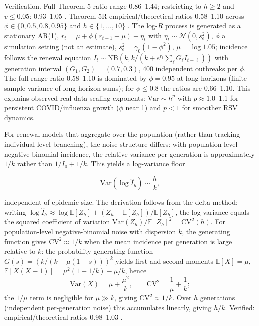 \documentclass[review]{elsarticle}
\theoremstyle{plain}
\theoremstyle{definition}
\begin{document}
Verification. Full Theorem 5 ratio range 0.86--1.44; restricting to $h \geq 2$ and $v \leq 0.05$: 0.93--1.05 . Theorem 5R empirical/theoretical ratios 0.58--1.10 across $\phi \in \{0, 0.5, 0.8, 0.95\}$ and $h \in \{1, \dots, 10\}$ . The log-$R$ process is generated as a stationary AR(1), $r_t = \mu + \phi(r_{t-1}-\mu) + \eta_t$ with $\eta_t \sim \mathcal{N}(0, s_e^2)$, $\phi$ a simulation setting (not an estimate), $s_e^2 = \gamma_0(1-\phi^2)$, $\mu = \log 1.05$; incidence follows the renewal equation $I_t \sim \text{NB}(k, k/(k + e^{r_t}\sum_\ell G_\ell I_{t-\ell}))$ with generation interval $(G_1, G_2) = (0.7, 0.3)$, 400 independent outbreaks per $\phi$. The full-range ratio 0.58--1.10 is dominated by $\phi = 0.95$ at long horizons (finite-sample variance of long-horizon sums); for $\phi \leq 0.8$ the ratios are 0.66--1.10. This explains observed real-data scaling exponents: $\text{Var} \sim h^p$ with $p \approx 1.0$--1.1 for persistent COVID/influenza growth ($\phi$ near 1) and $p < 1$ for smoother RSV dynamics.

For renewal models that aggregate over the population (rather than tracking individual-level branching), the noise structure differs: with population-level negative-binomial incidence, the relative variance per generation is approximately $1/k$ rather than $1/I_0 + 1/k$. This yields a log-variance floor

\begin{equation}
\text{Var}(\log \hat{I}_h) \sim \frac{h}{k},
\label{eq:pop_floor}
\end{equation}

independent of epidemic size. The derivation follows from the delta method: writing $\log \hat{I}_h \approx \log \mathbb{E}[Z_h] + (Z_h - \mathbb{E}[Z_h])/\mathbb{E}[Z_h]$, the log-variance equals the squared coefficient of variation $\text{Var}(Z_h)/\mathbb{E}[Z_h]^2 = \text{CV}^2(h)$. For population-level negative-binomial noise with dispersion $k$, the generating function gives $\text{CV}^2 \approx 1/k$ when the mean incidence per generation is large relative to $k$: the probability generating function $G(s) = (k/(k+\mu(1-s)))^k$ yields first and second moments $\mathbb{E}[X] = \mu$, $\mathbb{E}[X(X-1)] = \mu^2(1+1/k) - \mu/k$, hence
\begin{equation}
\text{Var}(X) = \mu + \frac{\mu^2}{k}, \qquad \text{CV}^2 = \frac{1}{\mu} + \frac{1}{k};
\end{equation}
the $1/\mu$ term is negligible for $\mu \gg k$, giving $\text{CV}^2 \approx 1/k$. Over $h$ generations (independent per-generation noise) this accumulates linearly, giving $h/k$. Verified: empirical/theoretical ratios 0.98--1.03 .
\end{document}
